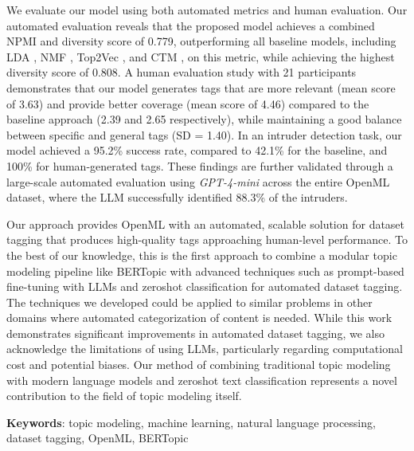 We evaluate our model using both automated metrics and human evaluation. Our automated evaluation reveals that the proposed model achieves a combined NPMI and diversity score of 0.779, outperforming all baseline models, including LDA \cite{blei_latent_2001}, NMF \cite{shahnaz_document_2006, kasiviswanathan_emerging_2011, yan_learning_2013}, Top2Vec \cite{angelov_top2vec_2020}, and CTM \cite{bianchi_pre-training_2021, bianchi_cross-lingual_2021}, on this metric, while achieving the highest diversity score of 0.808. A human evaluation study with 21 participants demonstrates that our model generates tags that are more relevant (mean score of 3.63) and provide better coverage (mean score of 4.46) compared to the baseline approach (2.39 and 2.65 respectively), while maintaining a good balance between specific and general tags (SD = 1.40). In an intruder detection task, our model achieved a 95.2\% success rate, compared to 42.1\% for the baseline, and 100\% for human-generated tags. These findings are further validated through a large-scale automated evaluation using \textit{GPT-4-mini} across the entire OpenML dataset, where the LLM successfully identified 88.3\% of the intruders.

Our approach provides OpenML with an automated, scalable solution for dataset tagging that produces high-quality tags approaching human-level performance. To the best of our knowledge, this is the first approach to combine a modular topic modeling pipeline like BERTopic with advanced techniques such as prompt-based fine-tuning with LLMs and zeroshot classification for automated dataset tagging. The techniques we developed could be applied to similar problems in other domains where automated categorization of content is needed. While this work demonstrates significant improvements in automated dataset tagging, we also acknowledge the limitations of using LLMs, particularly regarding computational cost and potential biases. Our method of combining traditional topic modeling with modern language models and zeroshot text classification represents a novel contribution to the field of topic modeling itself.

\textbf{Keywords}: topic modeling, machine learning, natural language processing, dataset tagging, OpenML, BERTopic